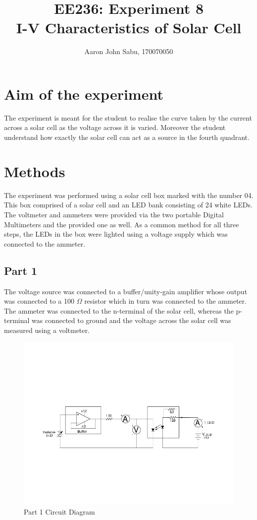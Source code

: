 \documentclass[12pt]{article}
\title{EE236: Experiment 8\\
I-V Characteristics of Solar Cell}
\author{Aaron John Sabu, 170070050}
\begin{document}
\maketitle

\section{Aim of the experiment}

The experiment is meant for the student to realise the curve taken by the current across a solar cell as the voltage across it is varied. Moreover the student understand how exactly the solar cell can act as a source in the fourth quadrant.

\section{Methods}

The experiment was performed using a solar cell box marked with the number 04. This box comprised of a solar cell and an LED bank consisting of 24 white LEDs. The voltmeter and ammeters were provided via the two portable Digital Multimeters and the provided one as well. As a common method for all three steps, the LEDs in the box were lighted using a voltage supply which was connected to the ammeter.

\subsection{Part 1}

The voltage source was connected to a buffer/unity-gain amplifier whose output was connected to a 100 \(\Omega\) resistor which in turn was connected to the ammeter. The ammeter was connected to the n-terminal of the solar cell, whereas the p-terminal was connected to ground and the voltage across the solar cell was measured using a voltmeter.


\begin{figure}[H]
	\centering
	\includegraphics[width = 1.1\linewidth, trim = {0 7cm 2.5cm 6cm}, clip]{Part1_CD.png}
	\caption{Part 1 Circuit Diagram}
\end{figure}
\end{document}
